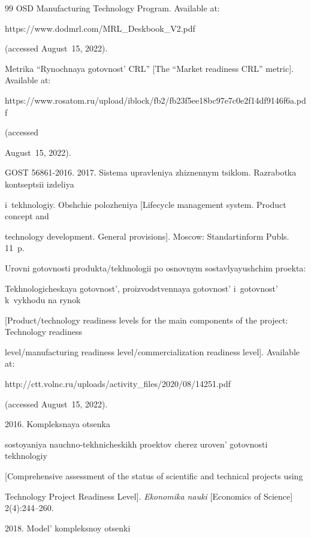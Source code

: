 {{\begin{thebibliography}{99}
OSD Manufacturing Technology Program. Available at: {\sf 

https://www.dodmrl.com/MRL\_\linebreak Deskbook\_V2.pdf}  (accessed August~15, 2022).


Metrika ``Rynochnaya gotovnost' CRL'' [The ``Market readiness CRL'' metric]. Available at: {\sf 

https://www.rosatom.ru/upload/iblock/fb2/fb23f5ee18bc97e7c0e2\linebreak f14df9146f6a.pdf} (accessed 

August~15, 2022).


GOST 56861-2016. 2017. Sistema upravleniya zhiznennym tsiklom. Razrabotka kontseptsii izdeliya 

i~tekhnologiy. Obshchie polozheniya [Lifecycle management system. Product concept and 

technology development. General provisions]. Moscow: Standartinform Publs. 11~p.


Urovni gotovnosti produkta/tekhnologii po osnovnym sostavlyayushchim proekta: 

Tekhnologicheskaya gotovnost', proizvodstvennaya gotovnost' i~gotovnost' k~vykhodu na rynok 

[Product/technology readiness levels for the main components of the project: Technology readiness 

level/manufacturing readiness level/commercialization readiness level]. Available at: {\sf 

http://ctt.volnc.ru/uploads/activity\_files/2020/08/14251.\linebreak pdf} (accessed August~15, 2022).


 2016. Kompleksnaya otsenka 

sostoyaniya nauchno-tekhnicheskikh proektov cherez uroven' gotovnosti tekhnologiy 

[Comprehensive assessment of the status of scientific and technical projects using 

Technology Project Readiness Level]. \textit{Ekonomika nauki} [Economics of Science] 2(4):244--260.


 2018. Model' kompleksnoy otsenki 


\end{thebibliography}}}
